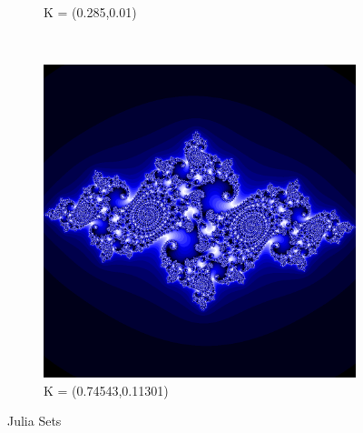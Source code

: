 \documentclass[a4paper]{article}
\begin{document}
\begin{figure}[h]
\begin{subfigure}[h]{0.25\textwidth}
        \caption{K = (0.285,0.01)}
        \label{fig:tiger}
    \end{subfigure}
    ~ %
    \begin{subfigure}[h]{0.25\textwidth}
        \includegraphics[width=\textwidth]{Julia(5)}
        \caption{K = (0.74543,0.11301)}
        \label{fig:mouse}
    \end{subfigure}
    \caption{Julia Sets}\label{fig:animals}
\end{figure} 
\end{document}

